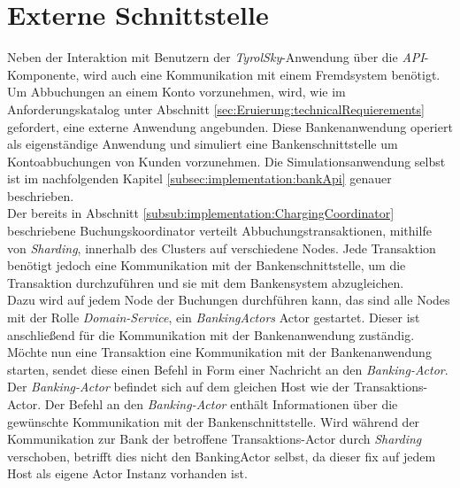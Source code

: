 \section{Externe Schnittstelle}
\label{sec:implementation:externalApi}
Neben der Interaktion mit Benutzern der \textit{TyrolSky}-Anwendung über die \textit{API}-Komponente, wird auch eine Kommunikation mit einem Fremdsystem benötigt. Um Abbuchungen an einem Konto vorzunehmen, wird, wie im Anforderungskatalog unter Abschnitt \ref{sec:Eruierung:technicalRequierements} gefordert, eine externe Anwendung angebunden. Diese Bankenanwendung operiert als eigenständige Anwendung und simuliert eine Bankenschnittstelle um Kontoabbuchungen von Kunden vorzunehmen. Die Simulationsanwendung selbst ist im nachfolgenden Kapitel \ref{subsec:implementation:bankApi} genauer beschrieben. \\
Der bereits in Abschnitt \ref{subsub:implementation:ChargingCoordinator}  beschriebene Buchungskoordinator verteilt Abbuchungstransaktionen, mithilfe von \textit{Sharding}, innerhalb des Clusters auf verschiedene Nodes. Jede Transaktion benötigt jedoch eine Kommunikation mit der Bankenschnittstelle, um die Transaktion durchzuführen und sie mit dem Bankensystem abzugleichen.  \\
Dazu wird auf jedem Node der Buchungen durchführen kann, das sind alle Nodes mit der Rolle \textit{Domain-Service}, ein \textit{BankingActors} Actor gestartet. Dieser ist anschließend für die Kommunikation mit der Bankenanwendung zuständig. \\
Möchte nun eine Transaktion eine Kommunikation mit der Bankenanwendung starten, sendet diese einen Befehl in Form einer Nachricht an den \textit{Banking-Actor}. Der \textit{Banking-Actor} befindet sich auf dem gleichen Host wie der Transaktions-Actor. Der Befehl an den \textit{Banking-Actor} enthält Informationen über die gewünschte Kommunikation mit der Bankenschnittstelle. Wird während der Kommunikation zur Bank der betroffene Transaktions-Actor durch \textit{Sharding} verschoben, betrifft dies nicht den BankingActor selbst, da dieser fix auf jedem Host als eigene Actor Instanz vorhanden ist. 
